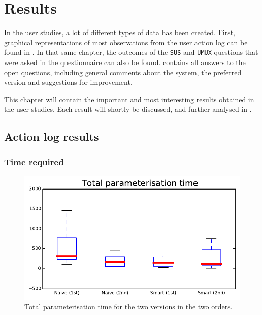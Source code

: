 \chapter{Results}

In the user studies, a lot of different types of data has been created. First, graphical representations of most observations from the user action log can be found in . In that same chapter, the outcomes of the \verb|SUS| and \verb|UMUX| questions that were asked in the questionnaire can also be found.  contains all answers to the open questions, including general comments about the system, the preferred version and suggestions for improvement.

This chapter will contain the important and most interesting results obtained in the user studies. Each result will shortly be discussed, and further analysed in .


\section{Action log results}
\nlipsum

\subsection{Time required}
\nlipsum

\begin{figure}
\center
\includegraphics[width=.9\textwidth]{img/graphs/1a_02.pdf}
\caption{Total parameterisation time for the two versions in the two orders.}
\end{figure}

